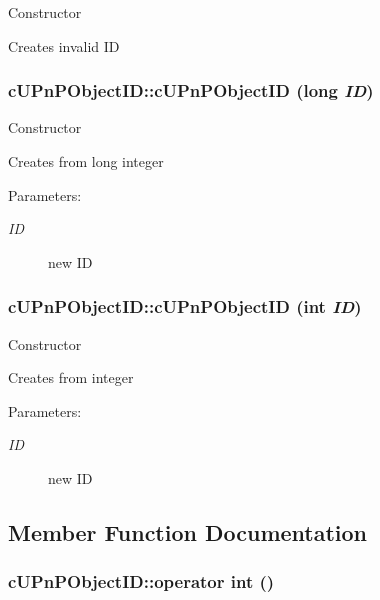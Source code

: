 Constructor

Creates invalid ID \hypertarget{structcUPnPObjectID_baeac468c4117f2fac4e3d93f3de9730}{
\subsubsection[{cUPnPObjectID}]{\setlength{\rightskip}{0pt plus 5cm}cUPnPObjectID::cUPnPObjectID (long {\em ID})}}
\label{structcUPnPObjectID_baeac468c4117f2fac4e3d93f3de9730}


Constructor

Creates from long integer \begin{Desc}
\item[Parameters:]
\begin{description}
\item[{\em ID}]new ID \end{description}
\end{Desc}
\hypertarget{structcUPnPObjectID_f3e044892ae1c1d840d4154ab96a2440}{
\subsubsection[{cUPnPObjectID}]{\setlength{\rightskip}{0pt plus 5cm}cUPnPObjectID::cUPnPObjectID (int {\em ID})}}
\label{structcUPnPObjectID_f3e044892ae1c1d840d4154ab96a2440}


Constructor

Creates from integer \begin{Desc}
\item[Parameters:]
\begin{description}
\item[{\em ID}]new ID \end{description}
\end{Desc}


\subsection{Member Function Documentation}
\hypertarget{structcUPnPObjectID_73ff8d0e18486552dbfbf828a2e7bc7c}{
\subsubsection[{operator int}]{\setlength{\rightskip}{0pt plus 5cm}cUPnPObjectID::operator int ()}}
\label{structcUPnPObjectID_73ff8d0e18486552dbfbf828a2e7bc7c}


